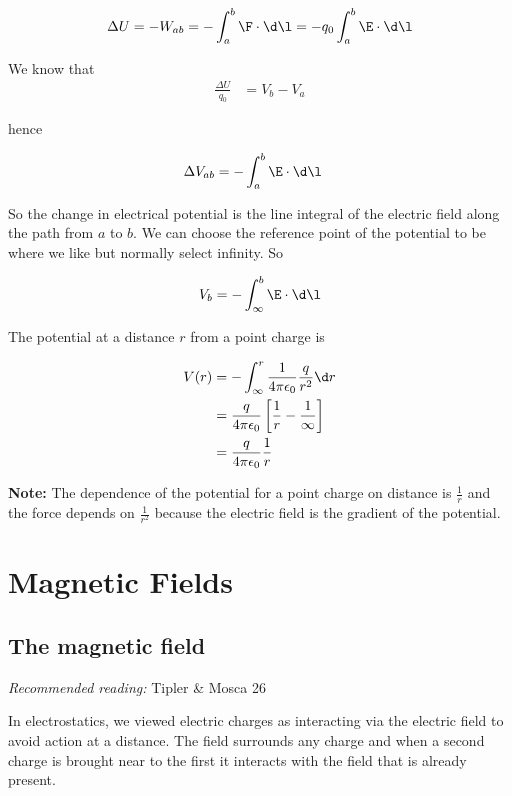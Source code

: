 \documentclass[
]{book}
\theoremstyle{definition}
\theoremstyle{definition}
\theoremstyle{definition}
\theoremstyle{definition}
\theoremstyle{remark}
\begin{document}
\[\begin{aligned}
\Delta U = - W_{ab} = -\int_a^b \F \cdot \d\l = -q_0 \int_a^b \E \cdot \d\l
\end{aligned}\]

We know that \[\begin{aligned}
\frac{\Delta U}{q_0} &= V_b - V_a
\end{aligned}\]

hence

\[\begin{aligned}
\Delta V_{ab} &= -\int_a^b \E \cdot \d\l
\end{aligned}\]

So the change in electrical potential is the line integral of the
electric field along the path from \(a\) to \(b\). We can choose the
reference point of the potential to be where we like but normally select
infinity. So

\[\begin{aligned}
V_b = -\int_\infty^b \E \cdot \d\l
\end{aligned}\]

The potential at a distance \(r\) from a point charge is

\[\begin{aligned}
V(r) &= -\int_\infty^r \frac{1}{4\pi\epsilon_0} \frac{q}{r^2} \d r \\
     &= \frac{q}{4\pi\epsilon_0} \left[ \frac{1}{r} - \frac{1}{\infty} \right] \\
     &= \frac{q}{4\pi\epsilon_0} \frac{1}{r}
\end{aligned}\]

\textbf{Note:} The dependence of the potential for a point charge on distance
is \(\frac{1}{r}\) and the force depends on \(\frac{1}{r^2}\) because the
electric field is the gradient of the potential.

\hypertarget{magnetic-fields}{%
\chapter{Magnetic Fields}\label{magnetic-fields}}

\hypertarget{the-magnetic-field}{%
\section{The magnetic field}\label{the-magnetic-field}}

\emph{Recommended reading:} Tipler \& Mosca 26

In electrostatics, we viewed electric charges as interacting via the
electric field to avoid action at a distance. The field surrounds any
charge and when a second charge is brought near to the first it
interacts with the field that is already present.
\end{document}
